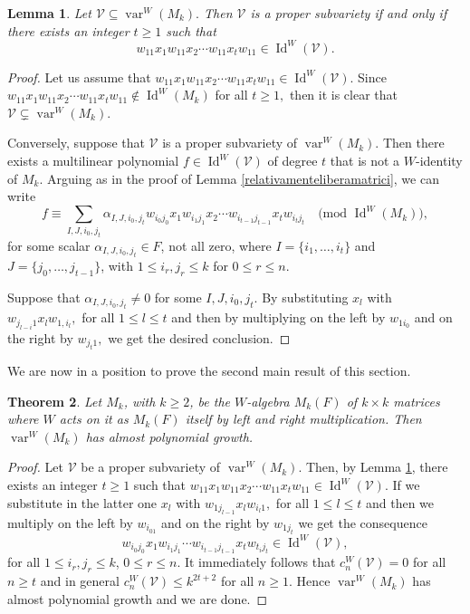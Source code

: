 \documentclass[reqno]{amsart}
\newtheorem{theorem}{Theorem}
\newtheorem{lemma}[theorem]{Lemma}
\theoremstyle{definition}
\numberwithin{equation}{section}
\numberwithin{theorem}{section}
\DeclareMathOperator{\V}{var}
\DeclareMathOperator{\I}{Id}
\begin{document}
\begin{lemma}\label{identitaaggiuntiva}
    Let $\mathcal{V}\subseteq \V^W(M_k).$ Then $\mathcal{V}$ is a proper subvariety if and only if there exists an integer $t\geq 1$ such that
    $$
    w_{11}x_1w_{11}x_2\cdots w_{11}x_tw_{11}\in \I^W(\mathcal{V}).
    $$
\end{lemma}
\begin{proof}
    Let us assume that $w_{11}x_1w_{11}x_2\cdots w_{11}x_tw_{11}\in \I^W(\mathcal{V}).$ Since $w_{11}x_1w_{11}x_2\cdots w_{11}x_tw_{11}\notin\I^W(M_k)$ for all $t\geq 1,$ then it is clear that $\mathcal{V}\subsetneq \V^W(M_k).$

    Conversely, suppose that $\mathcal{V}$ is a proper subvariety of $\V^W(M_k).$ Then there exists a multilinear polynomial $f\in \I^W(\mathcal{V})$ of degree $t$ that is not a $W$-identity of $M_k.$ Arguing as in the proof of Lemma \ref{relativamenteliberamatrici}, we can write
    $$
    f\equiv \sum_{I, J, i_0, j_t}\alpha_{I, J, i_0, j_t}w_{i_0j_0}x_1w_{i_1j_1}x_2\cdots w_{i_{t-1}j_{t-1}}x_tw_{i_tj_t} \quad \text{(mod }\I^W(M_k)),
    $$
  for some scalar $\alpha_{I, J, i_0, j_t}\in F$, not all zero, where $I=\{i_1,\ldots, i_t\}$ and $J=\{j_0,\ldots, j_{t-1}\}$, with $1\leq i_r,j_r\leq k$ for $0\leq r \leq n$.
    
    Suppose that $\alpha_{I, J, i_0, j_t}\neq 0$ for some $I,J,i_0,j_t$. 
    By substituting $x_l$ with $w_{j_{l-i}1}x_lw_{1,i_l},$ for all $1\leq l\leq t$ and then by multiplying on the left by $w_{1i_0}$ and on the right by $w_{j_t1},$ we get the desired conclusion.
\end{proof}

We are now in a position to prove the second main result of this section.

\begin{theorem}\label{matriciAPG}
     Let $M_k$, with $k\geq 2$,  be the $W$-algebra $M_k(F)$ of $k\times k$ matrices where $W$ acts on it as  $M_k(F)$ itself by left and right multiplication.  Then $\V^W(M_k)$ has almost polynomial growth.
\end{theorem}
\begin{proof}
    Let $\mathcal{V}$ be a proper subvariety of $\V^W(M_k).$ Then, by Lemma \ref{identitaaggiuntiva}, there exists an integer $t\geq 1$ such that $w_{11}x_1w_{11}x_2\cdots w_{11}x_tw_{11}\in \I^W(\mathcal{V}).$ If we substitute in the latter one $x_l$ with $w_{1j_{l-1}}x_lw_{i_l1},$ for all $1\leq l\leq t$ and then we multiply on the left by $w_{i_01}$ and on the right by $w_{1j_t}$ we get the consequence
    $$
    w_{i_0j_0}x_1w_{i_1j_1}\cdots w_{i_{t-1}j_{t-1}}x_tw_{t_ij_t}\in \I^W(\mathcal{V}),
    $$
    for all $1\leq i_r,j_r\leq k$, $0\leq r \leq n$. It immediately follows that $c_n^W(\mathcal{V}) = 0$ for all $n\geq t$ and in general $c_n^W(\mathcal{V})\leq k^{2t+2}$ for all $n\geq 1.$ Hence $\V^W(M_k)$ has almost polynomial growth and we are done.
\end{proof}
\end{document}
